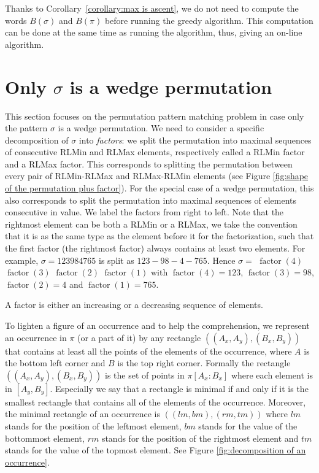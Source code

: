 \documentclass[a4paper]{llncs}
\newcommand{\bijection}{B}
\DeclareMathOperator{\factor}{factor}
\begin{document}
Thanks to Corollary~\ref{corollary:max is ascent},
we do not need to compute the words $\bijection(\sigma)$ and $\bijection(\pi)$ before running the greedy algorithm.
This computation can be done at the same time as running the algorithm,
thus, giving an on-line algorithm.



\section{Only $\sigma$ is a wedge permutation}
\label{section:sigma only avoid 231 and 213}

This section focuses on the permutation pattern matching problem
in case only the pattern $\sigma$ is a wedge permutation.
We need to consider a specific decomposition of $\sigma$ into \textit{factors}:
we split the permutation into maximal sequences of consecutive RLMin and RLMax elements, respectively called a RLMin factor and a RLMax factor.
This corresponds to splitting the permutation between every pair of RLMin-RLMax and RLMax-RLMin elements (see Figure \ref{fig:shape of the permutation plus factor}).
For the special case of a wedge permutation, this also corresponds to split the permutation into maximal sequences of elements consecutive in value.
We label the factors from right to left.
Note that the rightmost element can be both a RLMin or a RLMax,
we take the convention that it is as the same type as the element before it for the factorization,
such that the first factor (the rightmost factor) always contains at least two
elements.
For example,
$\sigma = 123984765$ is split as
$123-98-4-765$.
Hence
$\sigma =$ $\factor(4)$ $\factor(3)$ $\factor(2)$ $\factor(1)$ with
$\factor(4) =123$, $\factor(3) = 98$, $\factor(2) = 4$ and $\factor(1) = 765$.

\begin{remark}
A factor is either an increasing or a decreasing sequence of elements.
\end{remark}

To lighten a figure of an occurrence
and to help the comprehension,
we represent
an occurrence in $\pi$ (or a part of it) by any rectangle $((A_x,A_y),(B_x,B_y))$ that
contains
at least all the points of the elements of the occurrence,
where $A$ is the bottom left corner and
$B$ is the top right corner.
Formally the rectangle $((A_x,A_y),(B_x,B_y))$
is the set of points in $\pi[A_x:B_x]$
where each element is in $[A_y,B_y]$.
Especially we say that a rectangle is minimal
if and only if it is the smallest rectangle
that contains all of the elements of the occurrence.
Moreover, the minimal rectangle of an occurrence
is $((lm,bm),(rm,tm))$ where
$lm$ stands for the position of the leftmost element,
$bm$ stands for the value of the bottommost element,
$rm$ stands for the position of the rightmost element and
$tm$ stands for the value of the topmost element.
See Figure \ref{fig:decomposition of an occurrence}.
\end{document}
